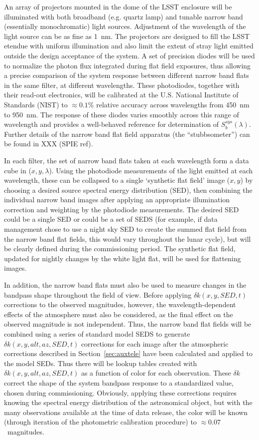 \documentclass[12pt,preprint]{aastex}
\begin{document}
An array of projectors mounted in the dome of the LSST enclosure will
be illuminated with both broadband (e.g. quartz lamp) and tunable
narrow band (essentially monochromatic) light sources.  Adjustment of
the wavelength of the light source can be as fine as 1~nm. The
projectors are designed to fill the LSST etendue with uniform
illumination and also limit the extent of stray light emitted outside
the design acceptance of the system. A set of precision diodes will be
used to normalize the photon flux integrated during flat field
exposures, thus allowing a precise comparison of the system response
between different narrow band flats in the same filter, at different
wavelengths.  These photodiodes, together with their read-out
electronics, will be calibrated at the U.S. National Institute of
Standards (NIST) to $\approx0.1\%$ relative accuracy across
wavelengths from 450~nm to 950~nm. The response of these diodes varies
smoothly across this range of wavelength and provides a well-behaved
reference for determination of $S_b^{sys}(\lambda)$.  Further details
of the narrow band flat field apparatus (the ``stubbsometer'') can be
found in XXX (SPIE ref). 

In each filter, the set of narrow band flats taken at each wavelength
form a data cube in ($x,y,\lambda$). Using the photodiode measurements
of the light emitted at each wavelength, these can be collapsed to a
single `synthetic flat field' image ($x,y$) by choosing a desired source
spectral energy distribution (SED), then combining the individual narrow
band images after applying an appropriate illumination correction and
weighting by the photodiode measurements. The desired
SED could be a single SED or could be a set of SEDS (for example, if
data management chose to use a night sky SED to create the summed
flat field from the narrow band flat fields, this would vary
throughout the lunar cycle), but will be clearly defined during the
commissioning period. The synthetic flat field, updated for nightly
changes by the white light flat, will be used for flattening images.

In addition, the narrow band flats must also be used to measure
changes in the bandpass shape throughout the field of view. Before
applying $\delta k(x,y,SED,t)$ corrections to the observed magnitudes,
however, the wavelength-dependent effects of the atmosphere must also
be considered, as the final effect on the observed magnitude is not
independent. Thus, the narrow band flat fields will be combined using
a series of standard model SEDS to generate
$\delta k(x,y,alt,az,SED,t)$ corrections for each image after the atmospheric
corrections described in Section~\ref{sec:auxtele} have been
calculated and applied to the model SEDs. Thus there will be lookup
tables created with $\delta k(x,y,alt,az,SED,t)$ as a function of
color for each observation. These $\delta k$ correct the shape of the
system bandpass response to a standardized value, chosen during
commissioning.  Obviously, applying these corrections requires knowing
the spectral energy distribution of the astronomical object, but with
the many observations available at the time of data release, the color
will be known (through iteration of the photometric calibration
procedure) to $\approx 0.07$~magnitudes.
\end{document}
